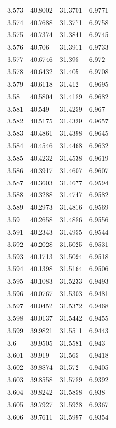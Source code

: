 \begin{tabular}{llll}
3.573 & 40.8002 & 31.3701 & 6.9771 \\
3.574 & 40.7688 & 31.3771 & 6.9758 \\
3.575 & 40.7374 & 31.3841 & 6.9745 \\
3.576 & 40.706 & 31.3911 & 6.9733 \\
3.577 & 40.6746 & 31.398 & 6.972 \\
3.578 & 40.6432 & 31.405 & 6.9708 \\
3.579 & 40.6118 & 31.412 & 6.9695 \\
3.58 & 40.5804 & 31.4189 & 6.9682 \\
3.581 & 40.549 & 31.4259 & 6.967 \\
3.582 & 40.5175 & 31.4329 & 6.9657 \\
3.583 & 40.4861 & 31.4398 & 6.9645 \\
3.584 & 40.4546 & 31.4468 & 6.9632 \\
3.585 & 40.4232 & 31.4538 & 6.9619 \\
3.586 & 40.3917 & 31.4607 & 6.9607 \\
3.587 & 40.3603 & 31.4677 & 6.9594 \\
3.588 & 40.3288 & 31.4747 & 6.9582 \\
3.589 & 40.2973 & 31.4816 & 6.9569 \\
3.59 & 40.2658 & 31.4886 & 6.9556 \\
3.591 & 40.2343 & 31.4955 & 6.9544 \\
3.592 & 40.2028 & 31.5025 & 6.9531 \\
3.593 & 40.1713 & 31.5094 & 6.9518 \\
3.594 & 40.1398 & 31.5164 & 6.9506 \\
3.595 & 40.1083 & 31.5233 & 6.9493 \\
3.596 & 40.0767 & 31.5303 & 6.9481 \\
3.597 & 40.0452 & 31.5372 & 6.9468 \\
3.598 & 40.0137 & 31.5442 & 6.9455 \\
3.599 & 39.9821 & 31.5511 & 6.9443 \\
3.6 & 39.9505 & 31.5581 & 6.943 \\
3.601 & 39.919 & 31.565 & 6.9418 \\
3.602 & 39.8874 & 31.572 & 6.9405 \\
3.603 & 39.8558 & 31.5789 & 6.9392 \\
3.604 & 39.8242 & 31.5858 & 6.938 \\
3.605 & 39.7927 & 31.5928 & 6.9367 \\
3.606 & 39.7611 & 31.5997 & 6.9354 \\

\end{tabular}
